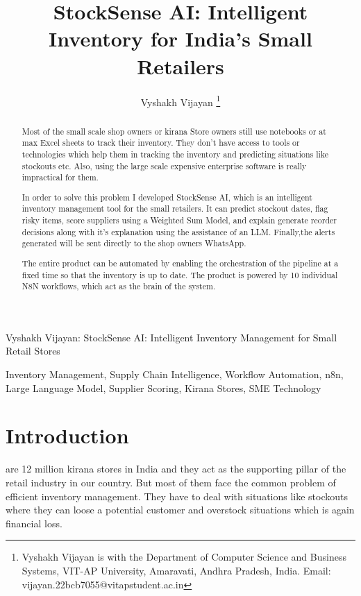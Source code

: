 \documentclass[journal]{IEEEtran}
\begin{document}
\raggedbottom

\title{StockSense AI: Intelligent Inventory for India's Small Retailers}

\author{Vyshakh Vijayan%
\thanks{Vyshakh Vijayan is with the Department of Computer Science and Business Systems, VIT-AP University, Amaravati, Andhra Pradesh, India. Email: vijayan.22bcb7055@vitapstudent.ac.in}%
}

%
{Vyshakh Vijayan: StockSense AI: Intelligent Inventory Management for Small Retail Stores}

\maketitle

\begin{abstract}
Most of the small scale shop owners or kirana Store owners still use notebooks or at max Excel sheets to track their inventory. They don't have access to  tools or technologies which help them in tracking the inventory and predicting situations like stockouts etc. Also, using the large scale expensive enterprise software is really impractical for them.

In order to solve this problem I developed StockSense AI, which is an intelligent inventory management tool for the small retailers. It can predict stockout dates, flag risky items, score suppliers using a Weighted Sum Model, and explain generate reorder decisions along with it's explanation using the assistance of an LLM. Finally,the alerts generated will be sent directly to the shop owners WhatsApp.

The entire product can be automated by enabling the orchestration of the pipeline at a fixed time so that the inventory is up to date. The product is powered  by 10 individual N8N workflows, which act as the brain of the system.
\end{abstract}

\begin{IEEEkeywords}
Inventory Management, Supply Chain Intelligence, Workflow Automation, n8n, Large Language Model, Supplier Scoring, Kirana Stores, SME Technology
\end{IEEEkeywords}

\section{Introduction}
 are 12 million kirana stores in India and they act as the supporting pillar of the retail industry in our country. But most of them face the common problem of efficient inventory management. They have to deal with situations like stockouts where they can loose a potential customer and overstock situations which is again financial loss.
\end{document}
